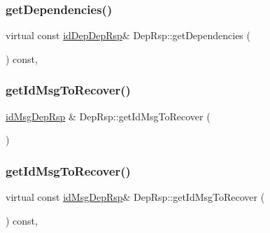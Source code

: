 \mbox{\label{classDepRsp_ad7d207f5cb583e04c7a8a6127bcb3fff}} 
\subsubsection{\texorpdfstring{get\+Dependencies()}{getDependencies()}\hspace{0.1cm}{\footnotesize\ttfamily [2/2]}}
{\footnotesize\ttfamily virtual const \hyperlink{depRsp__m_8h_a3c2ceb107008eb344443aaab2eb872b8}{id\+Dep\+Dep\+Rsp}\& Dep\+Rsp\+::get\+Dependencies (\begin{DoxyParamCaption}{ }\end{DoxyParamCaption}) const\hspace{0.3cm}{\ttfamily [inline]}, {\ttfamily [virtual]}}

\mbox{\label{classDepRsp_a7558f4f82be1ce27c894a068e2811ec6}} 
\subsubsection{\texorpdfstring{get\+Id\+Msg\+To\+Recover()}{getIdMsgToRecover()}\hspace{0.1cm}{\footnotesize\ttfamily [1/2]}}
{\footnotesize\ttfamily \hyperlink{depRsp__m_8h_a8a41011e0821f196429cd4bc45638bcf}{id\+Msg\+Dep\+Rsp} \& Dep\+Rsp\+::get\+Id\+Msg\+To\+Recover (\begin{DoxyParamCaption}{ }\end{DoxyParamCaption})\hspace{0.3cm}{\ttfamily [virtual]}}

\mbox{\label{classDepRsp_a209fe969214c0bf673d12a27bb923f92}} 
\subsubsection{\texorpdfstring{get\+Id\+Msg\+To\+Recover()}{getIdMsgToRecover()}\hspace{0.1cm}{\footnotesize\ttfamily [2/2]}}
{\footnotesize\ttfamily virtual const \hyperlink{depRsp__m_8h_a8a41011e0821f196429cd4bc45638bcf}{id\+Msg\+Dep\+Rsp}\& Dep\+Rsp\+::get\+Id\+Msg\+To\+Recover (\begin{DoxyParamCaption}{ }\end{DoxyParamCaption}) const\hspace{0.3cm}{\ttfamily [inline]}, {\ttfamily [virtual]}}

